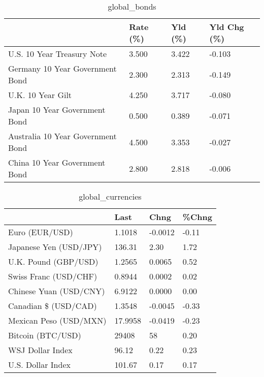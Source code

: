 \documentclass{article}%
\begin{document}
%


\begin{table}[htbp]%
\caption{global\_bonds}%
\centering%
\begin{adjustbox}{width=1\textwidth}%
\begin{tabular}{llll}
\toprule
                                  & Rate (\%) & Yld (\%) & Yld Chg (\%) \\
\midrule
       U.S. 10 Year Treasury Note &    3.500 &   3.422 &      -0.103 \\
  Germany 10 Year Government Bond &    2.300 &   2.313 &      -0.149 \\
                U.K. 10 Year Gilt &    4.250 &   3.717 &      -0.080 \\
    Japan 10 Year Government Bond &    0.500 &   0.389 &      -0.071 \\
Australia 10 Year Government Bond &    4.500 &   3.353 &      -0.027 \\
    China 10 Year Government Bond &    2.800 &   2.818 &      -0.006 \\
\bottomrule
\end{tabular}
%
\end{adjustbox}%
\end{table}

%


\begin{table}[htbp]%
\caption{global\_currencies}%
\centering%
\begin{adjustbox}{width=1\textwidth}%
\begin{tabular}{llll}
\toprule
                       &    Last &    Chng & \%Chng \\
\midrule
        Euro (EUR/USD) &  1.1018 & -0.0012 & -0.11 \\
Japanese Yen (USD/JPY) &  136.31 &    2.30 &  1.72 \\
  U.K. Pound (GBP/USD) &  1.2565 &  0.0065 &  0.52 \\
 Swiss Franc (USD/CHF) &  0.8944 &  0.0002 &  0.02 \\
Chinese Yuan (USD/CNY) &  6.9122 &  0.0000 &  0.00 \\
  Canadian \$ (USD/CAD) &  1.3548 & -0.0045 & -0.33 \\
Mexican Peso (USD/MXN) & 17.9958 & -0.0419 & -0.23 \\
     Bitcoin (BTC/USD) &   29408 &      58 &  0.20 \\
      WSJ Dollar Index &   96.12 &    0.22 &  0.23 \\
     U.S. Dollar Index &  101.67 &    0.17 &  0.17 \\
\bottomrule
\end{tabular}
%
\end{adjustbox}%
\end{table}
\end{document}
